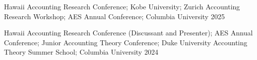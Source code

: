 

\begin{cventries}

\cventrylong
    {Hawaii Accounting Research Conference; Kobe University; Zurich Accounting Research Workshop; AES Annual Conference; Columbia University}  %
    {2025} %
    {}
	
\cventrylong
	{Hawaii Accounting Research Conference (Discussant and Presenter); AES Annual Conference; Junior Accounting Theory Conference; Duke University Accounting Theory Summer School; Columbia University}  %
    {2024} %
    {}
    
\end{cventries}

